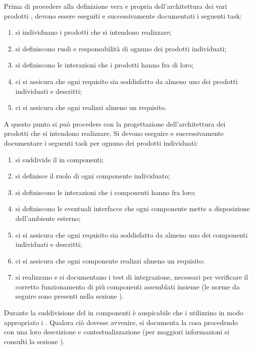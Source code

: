 			Prima di procedere alla definizione vera e propria dell'architettura dei vari prodotti , devono essere eseguiti e successivamente documentati i seguenti task:
			\begin{enumerate}
				\item si individuano i prodotti che si intendono realizzare;
				\item si definiscono ruoli e responsabilità di ognuno dei prodotti individuati;
				\item si definiscono le interazioni che i prodotti hanno fra di loro;
				\item ci si assicura che ogni requisito sia soddisfatto da almeno uno dei prodotti individuati e descritti;
				\item ci si assicura che ogni  realizzi almeno un requisito.
			\end{enumerate}
			A questo punto si può procedere con la progettazione dell'architettura dei prodotti  che si intendono realizzare. Si devono eseguire e successivamente documentare i seguenti task per ognuno dei prodotti individuati:
			\begin{enumerate}
				\item si suddivide il  in componenti;
				\item si definisce il ruolo di ogni componente individuato;
				\item si definiscono le interazioni che i componenti hanno fra loro;
				\item si definiscono le eventuali interfacce che ogni componente mette a disposizione dell'ambiente esterno;
				\item ci si assicura che ogni requisito sia soddisfatto da almeno uno dei componenti individuati e descritti;
				\item ci si assicura che ogni componente realizzi almeno un requisito;
				\item si realizzano e si documentano i test di integrazione, necessari per verificare il corretto funzionamento di più componenti assemblati insieme (le norme da seguire sono presenti nella sezione ).
			\end{enumerate}
			Durante la suddivisione del  in componenti è auspicabile che i  utilizzino in modo appropriato i . Qualora ciò dovesse avvenire, si documenta la cosa procedendo con una loro descrizione e contestualizzazione (per maggiori informazioni si consulti la sezione ).\\
